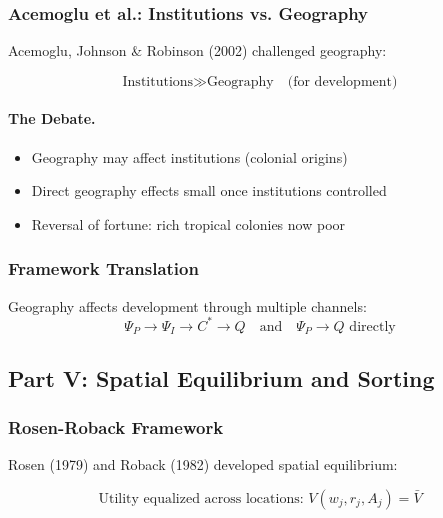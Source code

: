 \subsubsection{Acemoglu et al.: Institutions vs. Geography}

Acemoglu, Johnson \& Robinson (2002) challenged geography:

\begin{equation}
\text{Institutions} \gg \text{Geography} \quad \text{(for development)}
\end{equation}

\paragraph{The Debate.}
\begin{itemize}
    \item Geography may affect institutions (colonial origins)
    \item Direct geography effects small once institutions controlled
    \item Reversal of fortune: rich tropical colonies now poor
\end{itemize}

\subsubsection{Framework Translation}

Geography affects development through multiple channels:
\begin{equation}
\Psi_P \to \Psi_I \to C^* \to Q \quad \text{and} \quad \Psi_P \to Q \text{ directly}
\end{equation}

\subsection{Part V: Spatial Equilibrium and Sorting}

\subsubsection{Rosen-Roback Framework}

Rosen (1979) and Roback (1982) developed spatial equilibrium:

\begin{equation}
\boxed{
\text{Utility equalized across locations: } V(w_j, r_j, A_j) = \bar{V}
}
\label{eq:roback}
\end{equation}

